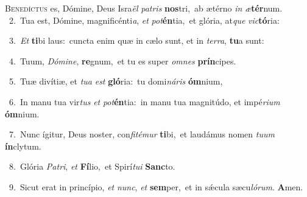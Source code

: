\lettrine{\initial\textcolor{\initialcolor}{B}}{enedíctus} es, Dómine, Deus Isra\textit{ël} \textit{pa}\-\textit{tris} \textbf{nos}\-tri,~\star ab ætérno \textit{in} \textit{æ}\-\textbf{tér}num.\\
{\numbfont\textcolor{\numbcolor}{~2.}}~Tua est, Dómine, magnificénti\-\textit{a}\-, \textit{et} \textit{pot}\-\textbf{én}tia,~\star et glória, at\textit{que} \textit{vic}\-\textbf{tó}ria:\par
{\numbfont\textcolor{\numbcolor}{~3.}}~\textit{Et} \textbf{ti}\-bi laus:~\star cuncta enim quæ in cælo sunt, et in \textit{ter}\-\textit{ra}, \textbf{tu}\-a sunt:\par
{\numbfont\textcolor{\numbcolor}{~4.}}~Tuum, \textit{Dó}\-\textit{mi}\textit{ne}, \textbf{re}\-gnum,~\star et tu es super \textit{om}\-\textit{nes} \textbf{prín}\-cipes.\par
{\numbfont\textcolor{\numbcolor}{~5.}}~Tuæ divítiæ, et \textit{tu}\-\textit{a} \textit{est} \textbf{gló}\-ria:~\star tu domi\-\textit{ná}\-\textit{ris} \textbf{óm}\-nium,\par
{\numbfont\textcolor{\numbcolor}{~6.}}~In manu tua vir\textit{tus} \textit{et} \textit{pot}\-\textbf{én}tia:~\star in manu tua magnitúdo, et impé\-\textit{ri}\-\textit{um} \textbf{óm}\-nium.\par
{\numbfont\textcolor{\numbcolor}{~7.}}~Nunc ígitur, Deus noster, con\-\textit{fi}\-\textit{té}\textit{mur} \textbf{ti}\-bi,~\star et laudámus nomen \textit{tu}\-\textit{um} \textbf{ín}\-clytum.\par
{\numbfont\textcolor{\numbcolor}{~8.}}~Glória \textit{Pa}\-\textit{tri}, \textit{et} \textbf{Fí}\-lio,~\star et Spirí\-\textit{tu}\-\textit{i} \textbf{Sanc}\-to.\par
{\numbfont\textcolor{\numbcolor}{~9.}}~Sicut erat in princípio, \textit{et} \textit{nunc}\-, \textit{et} \textbf{sem}\-per,~\star et in sǽcula sæcu\-\textit{ló}\-\textit{rum}. \textbf{A}\-men.\par
